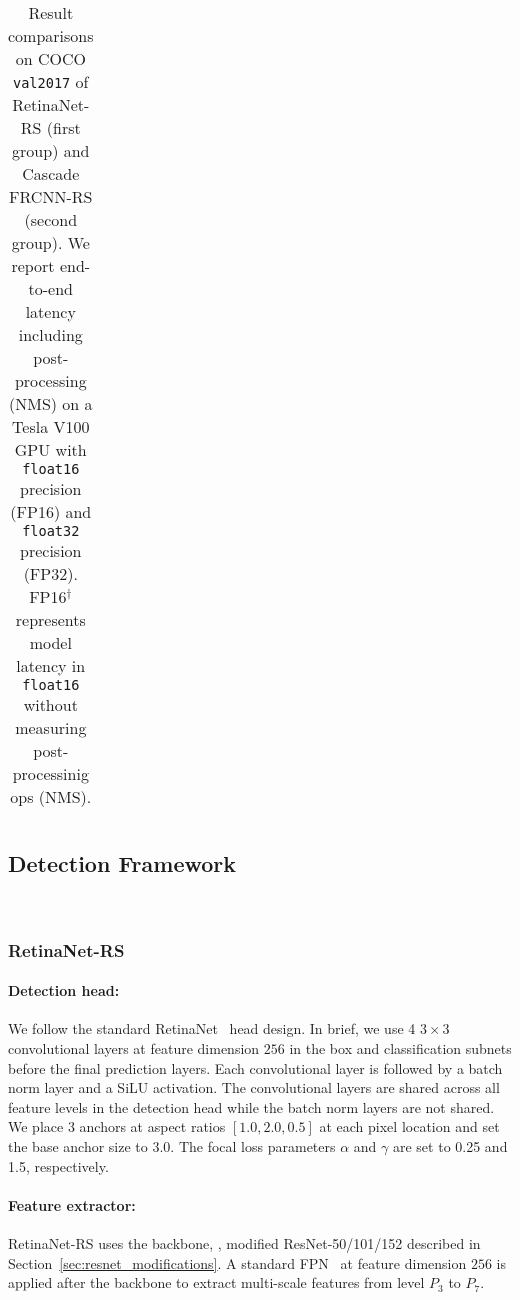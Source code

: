 \documentclass[final]{cvpr}
\begin{document}
\begin{table*}[!ht]
\begin{tabular}{c c  c | ccc| c | c c c}
\bottomrule
\end{tabular}
\caption{Result comparisons on COCO \texttt{val2017} of RetinaNet-RS (first group) and Cascade FRCNN-RS (second group). We report end-to-end latency including post-processing (\eg NMS) on a Tesla V100 GPU with \texttt{float16} precision (FP16) and \texttt{float32} precision (FP32). FP16$^\dagger$ represents model latency in \texttt{float16} without measuring post-processinig ops (NMS).}
\label{tab:mainresults}
\vspace{-0mm}
\end{table*}

\subsection{Detection Framework}~\label{sec:det_frameworks}
\subsubsection{RetinaNet-RS}
\label{sec:retinanet}
\paragraph{\bf Detection head:} We follow the standard RetinaNet~\cite{retinanet} head design. In brief, we use 4 $3\times3$ convolutional layers at feature dimension $256$ in the box and classification subnets before the final prediction layers. Each convolutional layer is followed by a batch norm layer and a SiLU activation. The convolutional layers are shared across all feature levels in the detection head while the batch norm layers are not shared. We place 3 anchors at aspect ratios $[1.0, 2.0, 0.5]$ at each pixel location and set the base anchor size to $3.0$. The focal loss parameters $\alpha$ and $\gamma$ are set to 0.25 and 1.5, respectively. 

\paragraph{\bf Feature extractor:} RetinaNet-RS uses the backbone, \eg, modified ResNet-50/101/152 described in Section~\ref{sec:resnet_modifications}. A standard FPN~\cite{fpn} at feature dimension $256$ is applied after the backbone to extract multi-scale features from level $P_3$ to $P_7$.

\end{document}
